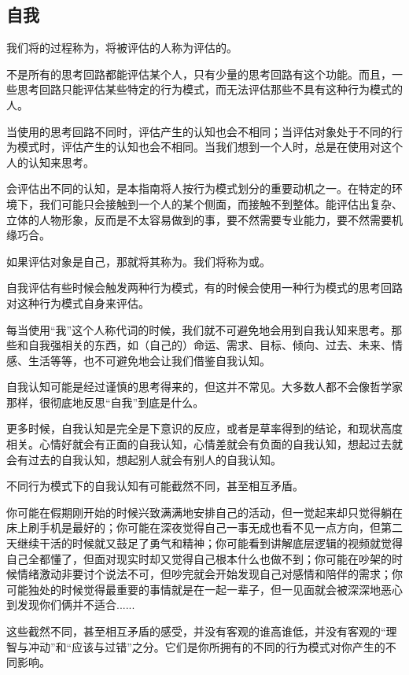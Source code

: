 \subsection{自我}
我们将的过程称为，将被评估的人称为评估的。
\begin{explain}
不是所有的思考回路都能评估某个人，只有少量的思考回路有这个功能。而且，一些思考回路只能评估某些特定的行为模式，而无法评估那些不具有这种行为模式的人。

当使用的思考回路不同时，评估产生的认知也会不相同；当评估对象处于不同的行为模式时，评估产生的认知也会不相同。当我们想到一个人时，总是在使用对这个人的认知来思考。

会评估出不同的认知，是本指南将人按行为模式划分的重要动机之一。在特定的环境下，我们可能只会接触到一个人的某个侧面，而接触不到整体。能评估出复杂、立体的人物形象，反而是不太容易做到的事，要不然需要专业能力，要不然需要机缘巧合。
\end{explain}
如果评估对象是自己，那就将其称为。我们将称为或。
\begin{explain}
自我评估有些时候会触发两种行为模式，有的时候会使用一种行为模式的思考回路对这种行为模式自身来评估。

每当使用“我”这个人称代词的时候，我们就不可避免地会用到自我认知来思考。那些和自我强相关的东西，如（自己的）命运、需求、目标、倾向、过去、未来、情感、生活等等，也不可避免地会让我们借鉴自我认知。

自我认知可能是经过谨慎的思考得来的，但这并不常见。大多数人都不会像哲学家那样，很彻底地反思“自我”到底是什么。

更多时候，自我认知是完全是下意识的反应，或者是草率得到的结论，和现状高度相关。心情好就会有正面的自我认知，心情差就会有负面的自我认知，想起过去就会有过去的自我认知，想起别人就会有别人的自我认知。
% 
\end{explain}
不同行为模式下的自我认知有可能截然不同，甚至相互矛盾。
\begin{examples}
你可能在假期刚开始的时候兴致满满地安排自己的活动，但一觉起来却只觉得躺在床上刷手机是最好的；你可能在深夜觉得自己一事无成也看不见一点方向，但第二天继续干活的时候就又鼓足了勇气和精神；你可能看到讲解底层逻辑的视频就觉得自己全都懂了，但面对现实时却又觉得自己根本什么也做不到；你可能在吵架的时候情绪激动非要讨个说法不可，但吵完就会开始发现自己对感情和陪伴的需求；你可能独处的时候觉得最重要的事情就是在一起一辈子，但一见面就会被深深地恶心到发现你们俩并不适合......

这些截然不同，甚至相互矛盾的感受，并没有客观的谁高谁低，并没有客观的“理智与冲动”和“应该与过错”之分。它们是你所拥有的不同的行为模式对你产生的不同影响。
\end{examples}
